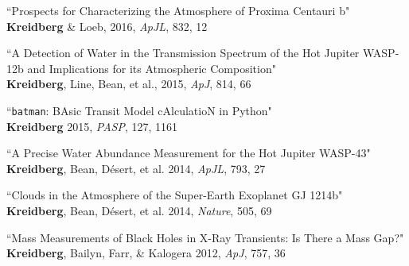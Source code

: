 \documentclass[12pt,letterpaper]{article}
\begin{document}
\begin{compactenum}
\item ``Prospects for Characterizing the Atmosphere of Proxima Centauri b"\\
\textbf{Kreidberg} \& Loeb, 2016, \textit{ApJL}, 832, 12 

\item ``A Detection of Water in the Transmission Spectrum of the Hot Jupiter WASP-12b and Implications for its Atmospheric Composition"\\
\textbf{Kreidberg}, Line,  Bean, et al., 2015, \textit{ApJ}, 814, 66

\item ``\texttt{batman}: BAsic Transit Model cAlculatioN in Python"\\
\textbf{Kreidberg} 2015, \textit{PASP}, 127, 1161 

\item ``A Precise Water Abundance Measurement for the Hot Jupiter WASP-43"\\
\textbf{Kreidberg}, Bean, D\'esert, et al. 2014, \textit{ApJL}, 793, 27

\item ``Clouds in the Atmosphere of the Super-Earth Exoplanet GJ 1214b"\\
\textbf{Kreidberg}, Bean, D\'esert, et al. 2014, \textit{Nature}, 505, 69

\item ``Mass Measurements of Black Holes in X-Ray Transients:  Is There a Mass Gap?"\\
\textbf{Kreidberg}, Bailyn, Farr, \& Kalogera 2012, \textit{ApJ}, 757, 36
\end{compactenum}
\end{document}

